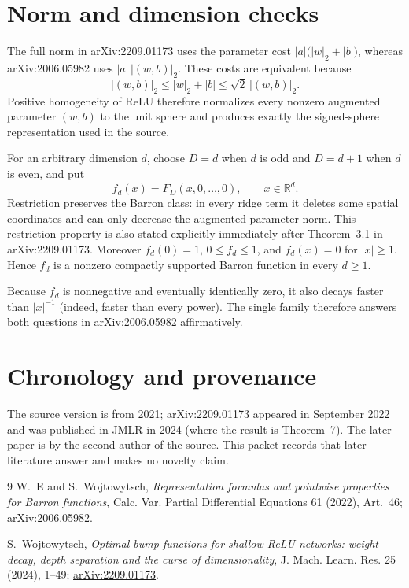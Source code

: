 \documentclass[10pt]{article}
\newcommand{\R}{\mathbb R}
\begin{document}
\section*{Norm and dimension checks}

The full norm in arXiv:2209.01173 uses the parameter cost
$|a|\bigl(|w|_2+|b|\bigr)$, whereas arXiv:2006.05982 uses
$|a|\,|(w,b)|_2$.  These costs are equivalent because
\[
 |(w,b)|_2\leq |w|_2+|b|\leq\sqrt2\,|(w,b)|_2.
\]
Positive homogeneity of ReLU therefore normalizes every nonzero augmented
parameter $(w,b)$ to the unit sphere and produces exactly the signed-sphere
representation used in the source.

For an arbitrary dimension $d$, choose $D=d$ when $d$ is odd and $D=d+1$
when $d$ is even, and put
\[
 f_d(x)=F_D(x,0,\ldots,0),\qquad x\in\R^d.
\]
Restriction preserves the Barron class: in every ridge term it deletes some
spatial coordinates and can only decrease the augmented parameter norm.  This
restriction property is also stated explicitly immediately after Theorem~3.1
in arXiv:2209.01173.  Moreover $f_d(0)=1$, $0\leq f_d\leq1$, and
$f_d(x)=0$ for $|x|\geq1$.  Hence $f_d$ is a nonzero compactly supported
Barron function in every $d\geq1$.

Because $f_d$ is nonnegative and eventually identically zero, it also decays
faster than $|x|^{-1}$ (indeed, faster than every power).  The single family
therefore answers both questions in arXiv:2006.05982 affirmatively.

\section*{Chronology and provenance}

The source version is from 2021; arXiv:2209.01173 appeared in September 2022
and was published in JMLR in 2024 (where the result is Theorem~7).  The later
paper is by the second author of the source.  This packet records that later
literature answer and makes no novelty claim.

{\small
\begin{thebibliography}{9}
W.~E and S.~Wojtowytsch,
\emph{Representation formulas and pointwise properties for Barron functions},
Calc. Var. Partial Differential Equations 61 (2022), Art.~46;
\href{https://arxiv.org/abs/2006.05982}{arXiv:2006.05982}.

S.~Wojtowytsch,
\emph{Optimal bump functions for shallow ReLU networks: weight decay, depth
separation and the curse of dimensionality},
J. Mach. Learn. Res. 25 (2024), 1--49;
\href{https://arxiv.org/abs/2209.01173}{arXiv:2209.01173}.
\end{thebibliography}
}
\end{document}
